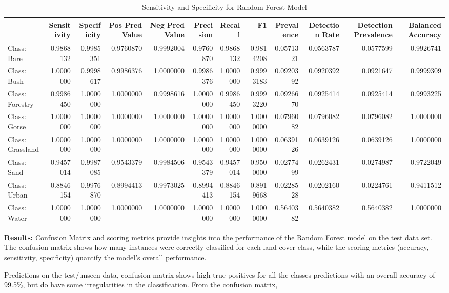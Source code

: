 \documentclass[
]{article}
\begin{document}
\begin{longtable}[l]{lrrrrrrrrrrr}
\caption{\label{tab:rf_confusion_matrix}Sensitivity and Specificity for Random Forest Model}\\
\toprule
 & Sensitivity & Specificity & Pos Pred Value & Neg Pred Value & Precision & Recall & F1 & Prevalence & Detection Rate & Detection Prevalence & Balanced Accuracy\\
\midrule
Class: Bare & 0.9868132 & 0.9985351 & 0.9760870 & 0.9992004 & 0.9760870 & 0.9868132 & 0.9814208 & 0.0571321 & 0.0563787 & 0.0577599 & 0.9926741\\
Class: Bush & 1.0000000 & 0.9998617 & 0.9986376 & 1.0000000 & 0.9986376 & 1.0000000 & 0.9993183 & 0.0920392 & 0.0920392 & 0.0921647 & 0.9999309\\
Class: Forestry & 0.9986450 & 1.0000000 & 1.0000000 & 0.9998616 & 1.0000000 & 0.9986450 & 0.9993220 & 0.0926670 & 0.0925414 & 0.0925414 & 0.9993225\\
Class: Gorse & 1.0000000 & 1.0000000 & 1.0000000 & 1.0000000 & 1.0000000 & 1.0000000 & 1.0000000 & 0.0796082 & 0.0796082 & 0.0796082 & 1.0000000\\
Class: Grassland & 1.0000000 & 1.0000000 & 1.0000000 & 1.0000000 & 1.0000000 & 1.0000000 & 1.0000000 & 0.0639126 & 0.0639126 & 0.0639126 & 1.0000000\\
\addlinespace
Class: Sand & 0.9457014 & 0.9987085 & 0.9543379 & 0.9984506 & 0.9543379 & 0.9457014 & 0.9500000 & 0.0277499 & 0.0262431 & 0.0274987 & 0.9722049\\
Class: Urban & 0.8846154 & 0.9976870 & 0.8994413 & 0.9973025 & 0.8994413 & 0.8846154 & 0.8919668 & 0.0228528 & 0.0202160 & 0.0224761 & 0.9411512\\
Class: Water & 1.0000000 & 1.0000000 & 1.0000000 & 1.0000000 & 1.0000000 & 1.0000000 & 1.0000000 & 0.5640382 & 0.5640382 & 0.5640382 & 1.0000000\\
\bottomrule
\end{longtable}

\textbf{Results:} Confusion Matrix and scoring metrics provide insights
into the performance of the Random Forest model on the test data set.
The confusion matrix shows how many instances were correctly classified
for each land cover class, while the scoring metrics (accuracy,
sensitivity, specificity) quantify the model's overall performance.

Predictions on the test/unseen data, confusion matrix shows high true
positives for all the classes predictions with an overall accuracy of
99.5\%, but do have some irregularities in the classification. From the
confusion matrix,
\end{document}
